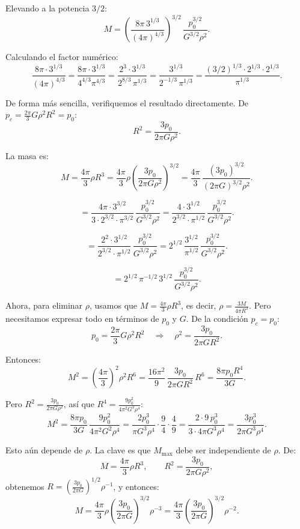 Elevando a la potencia $3/2$:
$$
M = \left(\frac{8\pi\, 3^{1/3}}{(4\pi)^{4/3}}\right)^{3/2}\,\frac{p_0^{3/2}}{G^{3/2}\rho^2}.
$$

Calculando el factor numérico:
$$
\frac{8\pi\cdot 3^{1/3}}{(4\pi)^{4/3}} = \frac{8\pi\cdot 3^{1/3}}{4^{4/3}\pi^{4/3}} = \frac{2^3\cdot 3^{1/3}}{2^{8/3}\,\pi^{1/3}} = \frac{3^{1/3}}{2^{-1/3}\,\pi^{1/3}} = \frac{(3/2)^{1/3}\cdot 2^{1/3}\cdot 2^{1/3}}{\pi^{1/3}}.
$$

De forma más sencilla, verifiquemos el resultado directamente. De $p_c = \frac{2\pi}{3}G\rho^2 R^2 = p_0$:
$$
R^2 = \frac{3p_0}{2\pi G\rho^2}.
$$

La masa es:
$$
M = \frac{4\pi}{3}\rho R^3 = \frac{4\pi}{3}\rho\left(\frac{3p_0}{2\pi G\rho^2}\right)^{3/2} = \frac{4\pi}{3}\,\frac{(3p_0)^{3/2}}{(2\pi G)^{3/2}\rho^2}.
$$

$$
= \frac{4\pi\cdot 3^{3/2}}{3\cdot 2^{3/2}\cdot \pi^{3/2}}\,\frac{p_0^{3/2}}{G^{3/2}\rho^2} = \frac{4\cdot 3^{1/2}}{2^{3/2}\cdot \pi^{1/2}}\,\frac{p_0^{3/2}}{G^{3/2}\rho^2}.
$$

$$
= \frac{2^2\cdot 3^{1/2}}{2^{3/2}\cdot \pi^{1/2}}\,\frac{p_0^{3/2}}{G^{3/2}\rho^2} = 2^{1/2}\,\frac{3^{1/2}}{\pi^{1/2}}\,\frac{p_0^{3/2}}{G^{3/2}\rho^2}.
$$

$$
= 2^{1/2}\,\pi^{-1/2}\,3^{1/2}\,\frac{p_0^{3/2}}{G^{3/2}\rho^2}.
$$

Ahora, para eliminar $\rho$, usamos que $M = \frac{4\pi}{3}\rho R^3$, es decir, $\rho = \frac{3M}{4\pi R^3}$. Pero necesitamos expresar todo en términos de $p_0$ y $G$. De la condición $p_c = p_0$:
$$
p_0 = \frac{2\pi}{3}G\rho^2 R^2 \quad \Longrightarrow \quad \rho^2 = \frac{3p_0}{2\pi G R^2}.
$$

Entonces:
$$
M^2 = \left(\frac{4\pi}{3}\right)^2 \rho^2 R^6 = \frac{16\pi^2}{9}\,\frac{3p_0}{2\pi G R^2}\,R^6 = \frac{8\pi p_0 R^4}{3G}.
$$

Pero $R^2 = \frac{3p_0}{2\pi G\rho^2}$, así que $R^4 = \frac{9p_0^2}{4\pi^2 G^2\rho^4}$:
$$
M^2 = \frac{8\pi p_0}{3G}\,\frac{9p_0^2}{4\pi^2 G^2\rho^4} = \frac{2p_0^3}{\pi G^3\rho^4}\cdot\frac{9}{4}\cdot\frac{4}{9} = \frac{2\cdot 9\, p_0^3}{3\cdot 4\pi G^3\rho^4} = \frac{3p_0^3}{2\pi G^3\rho^4}.
$$

Esto aún depende de $\rho$. La clave es que $M_{\text{max}}$ debe ser independiente de $\rho$. De:
$$
M = \frac{4\pi}{3}\rho R^3, \qquad R^2 = \frac{3p_0}{2\pi G\rho^2},
$$
obtenemos $R = \left(\frac{3p_0}{2\pi G}\right)^{1/2}\rho^{-1}$, y entonces:
$$
M = \frac{4\pi}{3}\rho\left(\frac{3p_0}{2\pi G}\right)^{3/2}\rho^{-3} = \frac{4\pi}{3}\left(\frac{3p_0}{2\pi G}\right)^{3/2}\rho^{-2}.
$$

